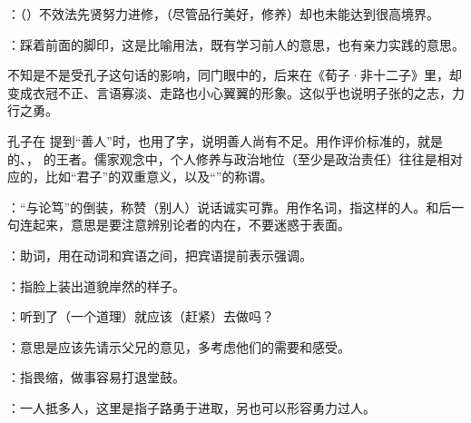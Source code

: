 {
\begin{lyblobitemize}
\item {}：（）不效法先贤努力进修，（尽管品行美好，修养）却也未能达到很高境界。

：踩着前面的脚印，这是比喻用法，既有学习前人的意思，也有亲力实践的意思。

不知是不是受孔子这句话的影响，同门眼中的，后来在《荀子·非十二子》里，却变成衣冠不正、言语寡淡、走路也小心翼翼的形象。这似乎也说明子张的之志，力行之勇。
\end{lyblobitemize}
孔子在   提到“善人”时，也用了字，说明善人尚有不足。用作评价标准的，就是  的、， 的王者。儒家观念中，个人修养与政治地位（至少是政治责任）往往是相对应的，比如“君子”的双重意义，以及“”的称谓。
}
{}


{
\item {}：“与论笃”的倒装，称赞（别人）说话诚实可靠。用作名词，指这样的人。和后一句连起来，意思是要注意辨别论者的内在，不要迷惑于表面。

：助词，用在动词和宾语之间，把宾语提前表示强调。

\item {}：指脸上装出道貌岸然的样子。
}
{}


{
\item {}：听到了（一个道理）就应该（赶紧）去做吗？
\item {}：意思是应该先请示父兄的意见，多考虑他们的需要和感受。
\item {}：指畏缩，做事容易打退堂鼓。
\item {}：一人抵多人，这里是指子路勇于进取，另也可以形容勇力过人。
}
{}


